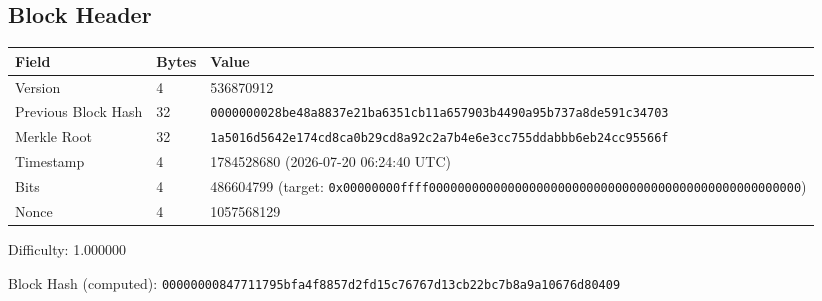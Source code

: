 \subsection*{Block Header}
\begin{tabular}{@{}lll@{}} \toprule
Field & Bytes & Value \\ \midrule
Version & 4 & 536870912 \\
Previous Block Hash & 32 & \texttt{0000000028be48a8837e21ba6351cb11a657903b4490a95b737a8de591c34703} \\
Merkle Root & 32 & \texttt{1a5016d5642e174cd8ca0b29cd8a92c2a7b4e6e3cc755ddabbb6eb24cc95566f} \\
Timestamp & 4 & 1784528680 (2026-07-20 06:24:40 UTC) \\
Bits & 4 & 486604799 (target: \texttt{0x00000000ffff0000000000000000000000000000000000000000000000000000}) \\
Nonce & 4 & 1057568129 \\
\bottomrule \end{tabular}

Difficulty: 1.000000

Block Hash (computed): \texttt{00000000847711795bfa4f8857d2fd15c76767d13cb22bc7b8a9a10676d80409}